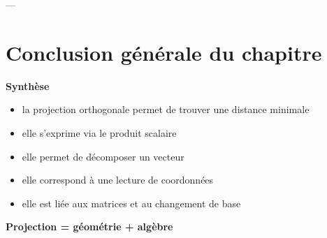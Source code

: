\documentclass[11pt,a4paper]{article}
\begin{document}
---

\section{Conclusion générale du chapitre}

\begin{center}
\Huge \textbf{Synthèse}
\end{center}

\bigskip

\begin{itemize}
\item la projection orthogonale permet de trouver une distance minimale
\item elle s’exprime via le produit scalaire
\item elle permet de décomposer un vecteur
\item elle correspond à une lecture de coordonnées
\item elle est liée aux matrices et au changement de base
\end{itemize}

\bigskip

\begin{center}
\Large \textbf{Projection = géométrie + algèbre}
\end{center}
\end{document}
